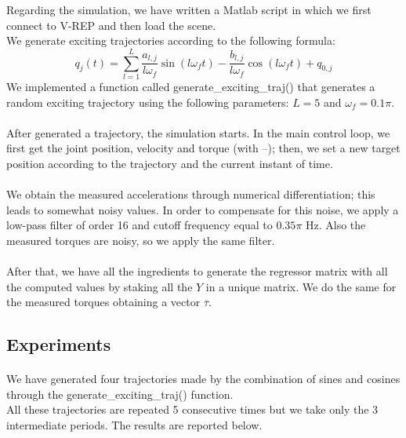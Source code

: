 \documentclass{article}
\begin{document}
\FloatBarrier
Regarding the simulation, we have written a Matlab script in which we first connect to V-REP and then load the scene.\\
We generate exciting trajectories according to the following formula:
\[q_j(t) = \sum_{l=1}^{L}{\frac{ a_{l,j}}{ l\omega_f }\sin(l\omega_f t)-\frac{ b_{l,j}}{l\omega_f}\cos(l\omega_f t)+q_{0,j}}\]
We implemented a function called generate\_exciting\_traj() that generates a random exciting trajectory using the following parameters: $L = 5$ and $\omega_f = 0.1\pi$.
\\\\
After generated a trajectory, the simulation starts. In the main control loop, we first get the joint position, velocity and torque (with –); then, we set a new target position according to the trajectory and the current instant of time.
\\\\
We obtain the measured accelerations through numerical differentiation; this leads to somewhat noisy values. In order to compensate for this noise, we apply a low-pass filter of order 16 and cutoff frequency equal to $0.35\pi$ Hz. Also the measured torques are noisy, so we apply the same filter.
\paragraph{}After that, we have all the ingredients to generate the regressor matrix with all the computed values by staking all the $Y$ in a unique matrix. We do the same for the measured torques obtaining a vector $\overline{\tau}$.

\subsection{Experiments}
\paragraph{}We have generated four trajectories made by the combination of sines and cosines through the generate\_exciting\_traj() function. \\ All these trajectories are repeated 5 consecutive times but we take only the 3 intermediate periods. The results are reported below.
\pagebreak
\end{document}
